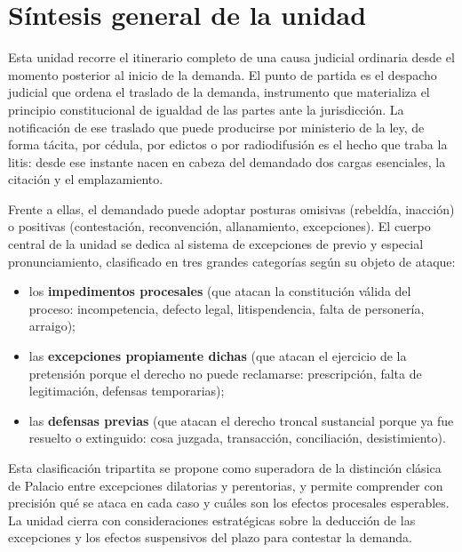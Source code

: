 \documentclass[12pt,oneside]{book}
\begin{document}
\chapter{Síntesis general de la unidad}

Esta unidad recorre el itinerario completo de una causa judicial ordinaria desde el momento posterior al inicio de la demanda. El punto de partida es el despacho judicial que ordena el traslado de la demanda, instrumento que materializa el principio constitucional de igualdad de las partes ante la jurisdicción. La notificación de ese traslado \textemdash{}que puede producirse por ministerio de la ley, de forma tácita, por cédula, por edictos o por radiodifusión\textemdash{} es el hecho que traba la litis: desde ese instante nacen en cabeza del demandado dos cargas esenciales, la citación y el emplazamiento.

Frente a ellas, el demandado puede adoptar posturas omisivas (rebeldía, inacción) o positivas (contestación, reconvención, allanamiento, excepciones). El cuerpo central de la unidad se dedica al sistema de excepciones de previo y especial pronunciamiento, clasificado en tres grandes categorías según su objeto de ataque:

\begin{itemize}
    \item los \textbf{impedimentos procesales} (que atacan la constitución válida del proceso: incompetencia, defecto legal, litispendencia, falta de personería, arraigo);
    \item las \textbf{excepciones propiamente dichas} (que atacan el ejercicio de la pretensión porque el derecho no puede reclamarse: prescripción, falta de legitimación, defensas temporarias);
    \item las \textbf{defensas previas} (que atacan el derecho troncal sustancial porque ya fue resuelto o extinguido: cosa juzgada, transacción, conciliación, desistimiento).
\end{itemize}

Esta clasificación tripartita se propone como superadora de la distinción clásica de Palacio entre excepciones dilatorias y perentorias, y permite comprender con precisión qué se ataca en cada caso y cuáles son los efectos procesales esperables. La unidad cierra con consideraciones estratégicas sobre la deducción de las excepciones y los efectos suspensivos del plazo para contestar la demanda.
\end{document}

